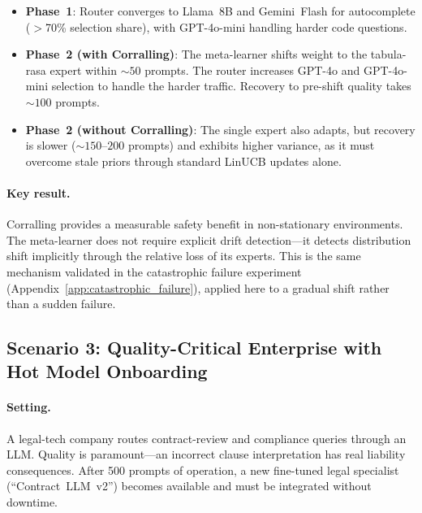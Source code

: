 \begin{itemize}[nosep,leftmargin=*]
    \item \textbf{Phase~1}: Router converges to Llama~8B and Gemini~Flash for autocomplete ($>$70\% selection share), with GPT-4o-mini handling harder code questions.
    \item \textbf{Phase~2 (with Corralling)}: The meta-learner shifts weight to the tabula-rasa expert within ${\sim}50$ prompts.  The router increases GPT-4o and GPT-4o-mini selection to handle the harder traffic.  Recovery to pre-shift quality takes ${\sim}100$ prompts.
    \item \textbf{Phase~2 (without Corralling)}: The single expert also adapts, but recovery is slower (${\sim}150$--$200$ prompts) and exhibits higher variance, as it must overcome stale priors through standard LinUCB updates alone.
\end{itemize}

\paragraph{Key result.}
Corralling provides a measurable safety benefit in non-stationary environments.  The meta-learner does not require explicit drift detection---it detects distribution shift implicitly through the relative loss of its experts.  This is the same mechanism validated in the catastrophic failure experiment (Appendix~\ref{app:catastrophic_failure}), applied here to a gradual shift rather than a sudden failure.


\subsection{Scenario 3: Quality-Critical Enterprise with Hot Model Onboarding}
\label{app:scenario_quality}

\paragraph{Setting.}
A legal-tech company routes contract-review and compliance queries through an LLM.  Quality is paramount---an incorrect clause interpretation has real liability consequences.  After 500 prompts of operation, a new fine-tuned legal specialist (``Contract~LLM~v2'') becomes available and must be integrated without downtime.

